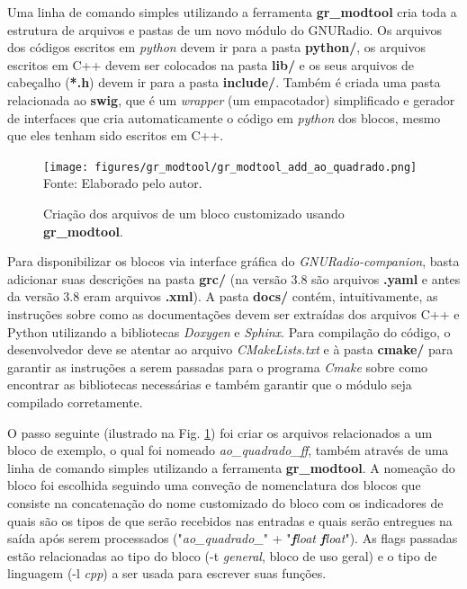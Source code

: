 \documentclass[
  12pt,				%
  openright,			%
  twoside,			%
  a4paper,			%
  english,			%
  french,				%
  spanish,			%
  brazil,				%
  ]{abntex2}
\begin{document}
Uma linha de comando simples utilizando a ferramenta \textbf{gr\_modtool} cria toda a estrutura de arquivos e pastas de um novo módulo do GNURadio. Os arquivos dos códigos escritos em
\textit{python} devem ir para a pasta \textbf{python/}, os arquivos escritos em C++ devem ser colocados na pasta \textbf{lib/} e os seus arquivos de cabeçalho (\textbf{*.h}) devem ir para a pasta
\textbf{include/}. Também é criada uma pasta relacionada ao \textbf{swig}, que é um \textit{wrapper} (um empacotador) simplificado e gerador de interfaces que cria automaticamente o
código em \textit{python} dos blocos, mesmo que eles tenham sido escritos em C++.

\begin{figure}[!htb]
  \centering
  \caption{Criação dos arquivos de um bloco customizado usando \textbf{gr\_modtool}.}
  \texttt{[image: figures/gr\_modtool/gr\_modtool\_add\_ao\_quadrado.png]}
  Fonte: Elaborado pelo autor.
  \label{fig:gr_modtool_add_ao_quadrado}
\end{figure}

Para disponibilizar os blocos via interface gráfica do \textit{GNURadio-companion}, basta adicionar suas descrições na pasta \textbf{grc/} (na versão 3.8 são arquivos \textbf{.yaml} e
antes da versão 3.8 eram arquivos \textbf{.xml}). A pasta \textbf{docs/} contém, intuitivamente, as instruções sobre como as documentações devem ser extraídas dos arquivos C++ e Python
utilizando a bibliotecas \textit{Doxygen} e \textit{Sphinx}. Para compilação do código, o desenvolvedor deve se atentar ao arquivo \textit{CMakeLists.txt} e à pasta \textbf{cmake/} para garantir
as instruções a serem passadas para o programa \textit{Cmake} sobre como encontrar as bibliotecas necessárias e também garantir que o módulo seja compilado corretamente.

O passo seguinte (ilustrado na Fig. \ref{fig:gr_modtool_add_ao_quadrado}) foi criar os arquivos relacionados a um bloco de exemplo, o qual foi nomeado \textit{ao\_quadrado\_ff}, também através de uma linha de comando simples utilizando a ferramenta
\textbf{gr\_modtool}. A nomeação do bloco foi escolhida seguindo uma conveção de nomenclatura dos blocos que consiste na concatenação do nome customizado do bloco com os indicadores de quais são
os tipos de que serão recebidos nas entradas e quais serão entregues na saída após serem processados ("\textit{ao\_quadrado\_}" + "\textit{\textbf{f}loat \textbf{f}loat}"). As flags passadas
estão relacionadas ao tipo do bloco (-t \textit{general}, bloco de uso geral) e o tipo de linguagem (-l \textit{cpp}) a ser usada para escrever suas funções.
\end{document}
